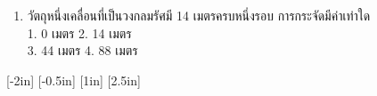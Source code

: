 \documentclass[a4paper,12pt]{book}
\begin{document}
\begin{enumerate}
	\item {} วัตถุหนึ่งเคลื่อนที่เป็นวงกลมรัศมี   14  เมตรครบหนึ่งรอบ   การกระจัดมีค่าเท่าใด \\ 
		1.  0  เมตร	\hfill			2.  14  เมตร		\hfill\phantom{xx} \\
		3.  44  เมตร		\hfill		4.  88   เมตร \hfill\phantom{xx}
\end{enumerate}
\vspace{0.8in}

[-2in]
[-0.5in]
[1in]
[2.5in]
\end{document}
